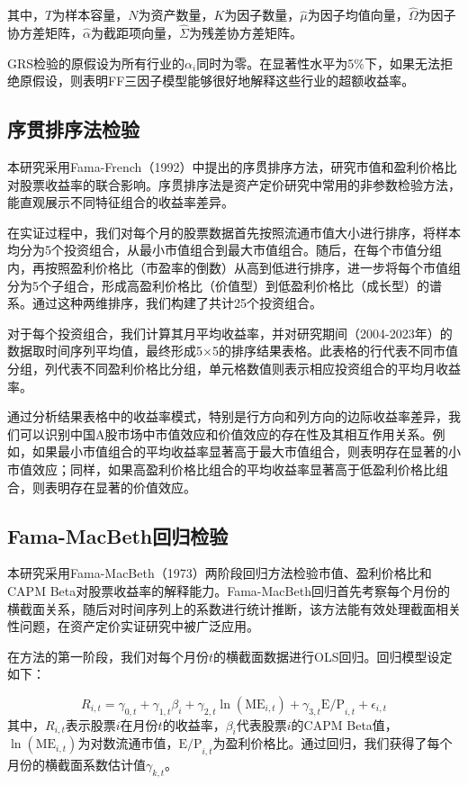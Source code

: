 \documentclass[12pt, a4paper]{article}
\begin{document}
其中，$T$为样本容量，$N$为资产数量，$K$为因子数量，$\hat{\mu}$为因子均值向量，$\hat{\Omega}$为因子协方差矩阵，$\hat{\alpha}$为截距项向量，$\hat{\Sigma}$为残差协方差矩阵。

GRS检验的原假设为所有行业的$\alpha_i$同时为零。在显著性水平为5\%下，如果无法拒绝原假设，则表明FF三因子模型能够很好地解释这些行业的超额收益率。

\subsection{序贯排序法检验}

本研究采用Fama-French（1992）中提出的序贯排序方法，研究市值和盈利价格比对股票收益率的联合影响。序贯排序法是资产定价研究中常用的非参数检验方法，能直观展示不同特征组合的收益率差异。

在实证过程中，我们对每个月的股票数据首先按照流通市值大小进行排序，将样本均分为5个投资组合，从最小市值组合到最大市值组合。随后，在每个市值分组内，再按照盈利价格比（市盈率的倒数）从高到低进行排序，进一步将每个市值组分为5个子组合，形成高盈利价格比（价值型）到低盈利价格比（成长型）的谱系。通过这种两维排序，我们构建了共计25个投资组合。

对于每个投资组合，我们计算其月平均收益率，并对研究期间（2004-2023年）的数据取时间序列平均值，最终形成5×5的排序结果表格。此表格的行代表不同市值分组，列代表不同盈利价格比分组，单元格数值则表示相应投资组合的平均月收益率。

通过分析结果表格中的收益率模式，特别是行方向和列方向的边际收益率差异，我们可以识别中国A股市场中市值效应和价值效应的存在性及其相互作用关系。例如，如果最小市值组合的平均收益率显著高于最大市值组合，则表明存在显著的小市值效应；同样，如果高盈利价格比组合的平均收益率显著高于低盈利价格比组合，则表明存在显著的价值效应。

\subsection{Fama-MacBeth回归检验}

本研究采用Fama-MacBeth（1973）两阶段回归方法检验市值、盈利价格比和CAPM Beta对股票收益率的解释能力。Fama-MacBeth回归首先考察每个月份的横截面关系，随后对时间序列上的系数进行统计推断，该方法能有效处理截面相关性问题，在资产定价实证研究中被广泛应用。

在方法的第一阶段，我们对每个月份$t$的横截面数据进行OLS回归。回归模型设定如下：

\begin{equation}
R_{i,t} = \gamma_{0,t} + \gamma_{1,t}\beta_{i} + \gamma_{2,t}\ln(\text{ME}_{i,t}) + \gamma_{3,t}\text{E/P}_{i,t} + \epsilon_{i,t}
\end{equation}
其中，$R_{i,t}$表示股票$i$在月份$t$的收益率，$\beta_i$代表股票$i$的CAPM Beta值，$\ln(\text{ME}_{i,t})$为对数流通市值，$\text{E/P}_{i,t}$为盈利价格比。通过回归，我们获得了每个月份的横截面系数估计值$\gamma_{k,t}$。
\end{document}
